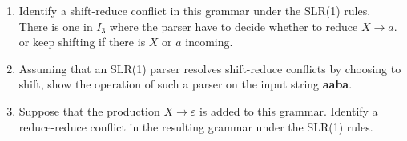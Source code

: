\documentclass[10pt]{article}
\begin{document}
\begin{enumerate}
\begin{enumerate}
\begin{center}
\end{center}
\item Identify a shift-reduce conflict in this grammar under the
SLR(1) rules.\\
	There is one in $I_3$ where the parser have to decide whether to reduce
	$X\rightarrow a.$ or keep shifting if there is $X$ or $a$ incoming.
\item Assuming that an SLR(1) parser resolves shift-reduce conflicts
by choosing to shift, show the operation of such a parser on the input
string \textbf{aaba}.
          \[
            \]
\item Suppose that the production $X \rightarrow \varepsilon$ is added
to this grammar.  Identify a reduce-reduce conflict in the resulting
grammar under the SLR(1) rules.
          \[
            \]
\end{enumerate}
\end{enumerate}
\end{document}
